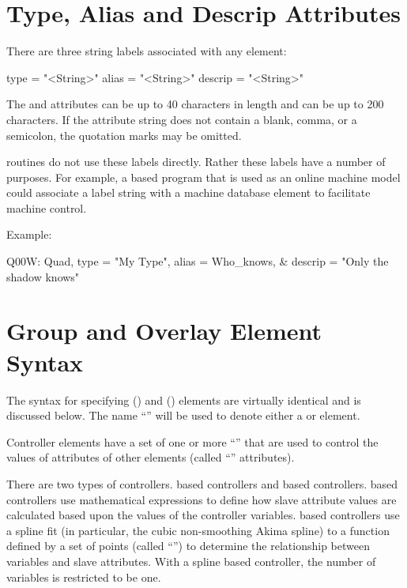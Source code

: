 \section{Type, Alias and Descrip Attributes}
\label{s:alias}

There are three string labels associated with any element:
\begin{example}
  type    = "<String>"
  alias   = "<String>"
  descrip = "<String>"
\end{example}
The  and  attributes can be up to 40 characters in length and  can be
up to 200 characters. If the attribute string does not contain a blank, comma, or a semicolon, the
quotation marks may be omitted.

\bmad routines do not use these labels directly. Rather these labels have a number of purposes. For
example, a \bmad based program that is used as an online machine model could associate a label
string with a machine database element to facilitate machine control.

Example:
\begin{example}
  Q00W: Quad, type = "My Type", alias = Who_knows, &
                                  descrip = "Only the shadow knows"
\end{example}

\section{Group and Overlay Element Syntax}
\label{s:go.syntax}

The syntax for specifying  () and  () elements
are virtually identical and is discussed below. The name ``'' will be used to denote
either a  or  element.

Controller elements have a set of one or more ``'' that are used to control the values
of attributes of other elements (called ``'' attributes).

There are two types of controllers.  based controllers and  based
controllers.  based controllers use mathematical expressions to define how slave
attribute values are calculated based upon the values of the controller variables.  based
controllers use a spline fit (in particular, the cubic non-smoothing Akima spline\cite{b:akima}) to
a function defined by a set of points (called ``'') to determine the relationship between
variables and slave attributes. With a spline based controller, the number of variables is
restricted to be one.


